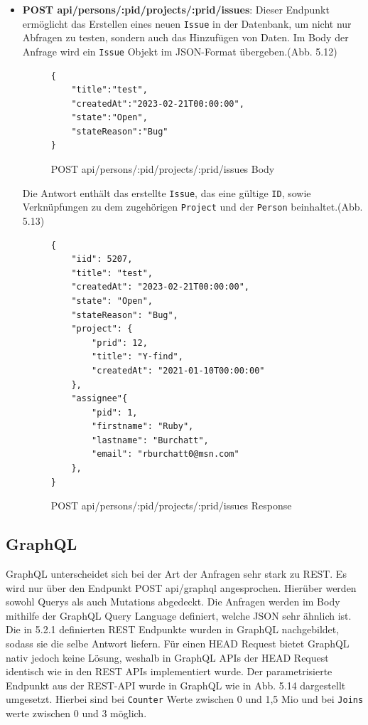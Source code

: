 \begin{itemize}
\item \colorbox{gray!20}{\textbf{POST api/persons/:pid/projects/:prid/issues}}: Dieser Endpunkt ermöglicht das Erstellen eines neuen  \texttt{Issue} in der Datenbank, um nicht nur Abfragen zu testen, sondern auch das Hinzufügen von Daten. Im Body der Anfrage wird ein  \texttt{Issue} Objekt im JSON-Format übergeben.(Abb. 5.12) 
\newline
\begin{figure}[H]
\begin{center}
\begin{BVerbatim}
{
    "title":"test",
    "createdAt":"2023-02-21T00:00:00",
    "state":"Open",
    "stateReason":"Bug"
}
\end{BVerbatim}
\end{center}
\caption{POST api/persons/:pid/projects/:prid/issues Body}
\end{figure}
Die Antwort enthält das erstellte \texttt{Issue}, das eine gültige  \texttt{ID}, sowie Verknüpfungen zu dem zugehörigen  \texttt{Project} und der  \texttt{Person} beinhaltet.(Abb. 5.13)
\begin{figure}[H]
\begin{center}
\begin{BVerbatim}
{
    "iid": 5207,
    "title": "test",
    "createdAt": "2023-02-21T00:00:00",
    "state": "Open",
    "stateReason": "Bug",
    "project": {
        "prid": 12,
        "title": "Y-find",
        "createdAt": "2021-01-10T00:00:00"
    },
    "assignee"{
        "pid": 1,
        "firstname": "Ruby",
        "lastname": "Burchatt",
        "email": "rburchatt0@msn.com"
    },
}
\end{BVerbatim}
\end{center}
\caption{POST api/persons/:pid/projects/:prid/issues Response}
\end{figure}
\end{itemize}


\subsection{GraphQL}
GraphQL unterscheidet sich bei der Art der Anfragen sehr stark zu REST. Es wird nur über den Endpunkt \colorbox{gray!20}{POST api/graphql} angesprochen. Hierüber werden sowohl Querys als auch Mutations abgedeckt. Die Anfragen werden im Body mithilfe der GraphQL Query Language definiert, welche JSON sehr ähnlich ist. Die in 5.2.1 definierten REST Endpunkte wurden in GraphQL nachgebildet, sodass sie die selbe Antwort liefern. Für einen HEAD Request bietet GraphQL nativ jedoch keine Lösung, weshalb in GraphQL APIs der HEAD Request identisch wie in den REST APIs implementiert wurde.
Der parametrisierte Endpunkt aus der REST-API wurde in GraphQL wie in Abb. 5.14 dargestellt umgesetzt. Hierbei sind bei  \texttt{Counter} Werte zwischen 0 und 1,5 Mio und bei  \texttt{Joins} werte zwischen 0 und 3 möglich.


